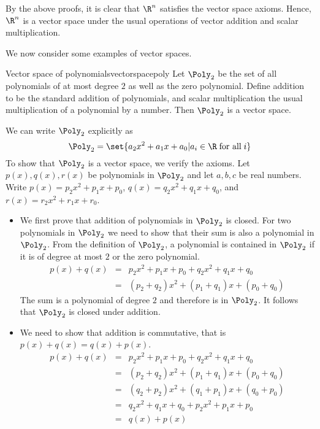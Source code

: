 \begin{solution}
By the above proofs, it is clear that $\R^n$ satisfies the vector space axioms. Hence, $\R^n$ is a vector space under the usual operations of vector addition and scalar multiplication. 
\end{solution}

We now consider some examples of vector spaces. 

\begin{example}{Vector space of polynomials}{vectorspacepoly}
Let $\Poly_2$ be the set of all polynomials of at most degree $2$ as well as the zero polynomial. Define addition to be the standard addition of polynomials, and scalar multiplication the usual multiplication of a polynomial by a number. Then $\Poly_2$ is a vector space. 
\end{example}

\begin{solution}
We can write $\Poly_2$ explicitly as 
\[
\Poly_2 = \set{a_2x^2 + a_1x + a_0 | a_i \in \R \; \mbox{for all} \; i }
\]
To show that $\Poly_2$ is a vector space, we verify the axioms. Let $p(x), q(x), r(x)$ be polynomials in $\Poly_2$ and let $a,b,c$ be real numbers. Write $p(x)=p_2x^2 + p_1x + p_0  $, $q(x)=q_2x^2 + q_1x + q_0  $, and $r(x)=r_2x^2 + r_1x + r_0$. 

\begin{itemize}
\item
We first prove that addition of polynomials in $\Poly_2$ is closed. For two polynomials in $\Poly_2$ we need to show that their sum is also a polynomial in $\Poly_2$. From the definition of $\Poly_2$, a polynomial is contained in $\Poly_2$ if it is of degree at most $2$ or the zero polynomial.
\begin{eqnarray*}
p(x) + q(x) &=& p_2x^2 + p_1x + p_0 + q_2x^2+ q_1x + q_0 \\
&=& (p_2+q_2)x^2 + (p_1+q_1)x + (p_0+q_0) 
\end{eqnarray*}
The sum is a polynomial of degree $2$ and therefore is in $\Poly_2$. It follows that $\Poly_2$ is closed under addition. 

\item
We need to show that addition is commutative, that is $p(x)+q(x) = q(x) + p(x)$.   
\begin{eqnarray*}
p(x) + q(x) &=&  p_2x^2 + p_1x + p_0 + q_2x^2 + q_1x + q_0\\
&=& (p_2+q_2)x^2 + (p_1+q_1)x + (p_0+q_0)  \\
&=&  (q_2+p_2)x^2 + (q_1+p_1)x + (q_0+p_0)  \\
&=& q_2x^2 + q_1x + q_0 + p_2x^2  + p_1x + p_0\\
&=& q(x) + p(x)
\end{eqnarray*}


\end{itemize}
\end{solution}
